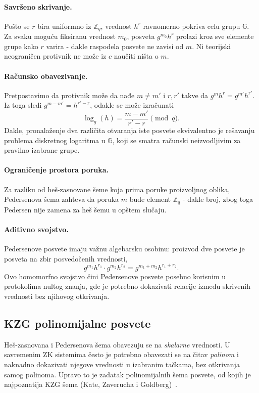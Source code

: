 \paragraph{Savršeno skrivanje.}
Pošto se $r$ bira uniformno iz $\mathbb{Z}_q$, vrednost $h^r$ ravnomerno pokriva celu grupu
$\mathbb{G}$. Za svaku moguću fiksiranu vrednost $m_0$, posveta $g^{m_0} h^r$ prolazi kroz sve
elemente grupe kako $r$ varira - dakle raspodela posvete ne zavisi od $m$. Ni teorijski
neograničen protivnik ne može iz $c$ naučiti ništa o $m$.

\paragraph{Računsko obavezivanje.}
Pretpostavimo da protivnik može da nađe $m \neq m'$ i $r, r'$ takve da
$g^m h^r = g^{m'} h^{r'}$. Iz toga sledi $g^{m-m'} = h^{r'-r}$, odakle se može izračunati
\[
  \log_g(h) = \frac{m - m'}{r' - r} \pmod{q}.
\]
Dakle, pronalaženje dva različita otvaranja iste posvete ekvivalentno je rešavanju problema
diskretnog logaritma u $\mathbb{G}$, koji se smatra računski neizvodljivim za pravilno
izabrane grupe.

\paragraph{Ograničenje prostora poruka.}
Za razliku od heš-zasnovane šeme koja prima poruke proizvoljnog oblika, Pedersenova šema
zahteva da poruka $m$ bude element $\mathbb{Z}_q$ - dakle broj, zbog toga Pedersen nije zamena za heš šemu u opštem slučaju.

\paragraph{Aditivno svojstvo.}
Pedersenove posvete imaju važnu algebarsku osobinu: proizvod dve posvete je posveta na zbir
posvedočenih vrednosti,
\[
  g^{m_1} h^{r_1} \cdot g^{m_2} h^{r_2} = g^{m_1 + m_2} h^{r_1 + r_2}.
\]
Ovo homomorfno svojstvo čini Pedersenove posvete posebno korisnim u protokolima nultog
znanja, gde je potrebno dokazivati relacije između skrivenih vrednosti bez njihovog otkrivanja.

\subsection{KZG polinomijalne posvete}
\label{subsec:kzg-commitment}

Heš-zasnovana i Pedersenova šema obavezuju se na \emph{skalarne} vrednosti. U savremenim
ZK sistemima često je potrebno obavezati se na čitav \emph{polinom} i naknadno dokazivati
njegove vrednosti u izabranim tačkama, bez otkrivanja samog polinoma. Upravo to je zadatak
polinomijalnih šema posvete, od kojih je najpoznatija KZG šema
(Kate, Zaverucha i Goldberg)~\cite{kate2010constant}.

